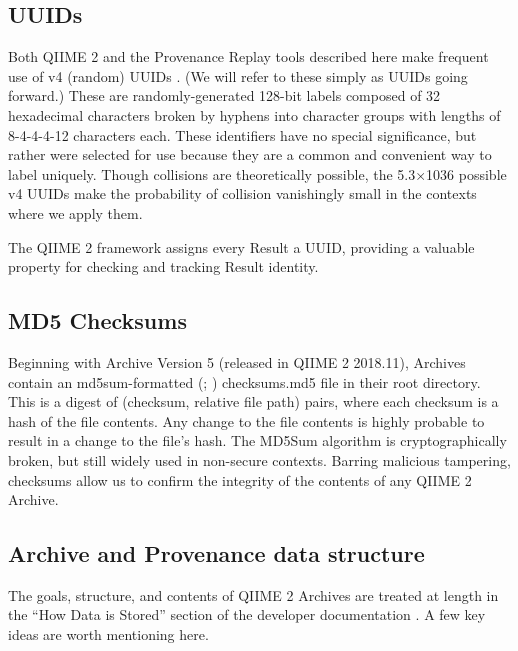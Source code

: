 \subsection{UUIDs}

Both QIIME 2 and the Provenance Replay tools described here make frequent use of
v4 (random) UUIDs \parencite{leach_universally_2005}.
(We will refer to these simply as UUIDs going forward.)
These are randomly-generated 128-bit labels composed of 32 hexadecimal
characters broken by hyphens into character groups with lengths of 8-4-4-4-12
characters each. These identifiers have no special significance, but rather were
selected for use because they are a common and convenient way to label uniquely.
Though collisions are theoretically possible, the 5.3×1036 possible v4 UUIDs
make the probability of collision vanishingly small in the contexts where we
apply them.

The QIIME 2 framework assigns every Result a UUID, providing a valuable property
for checking and tracking Result identity. 

\subsection{MD5 Checksums}

Beginning with Archive Version 5 (released in QIIME 2 2018.11), Archives contain
an md5sum-formatted (\cite{rivest_md5_1992}; \cite{ulrich_drepper_md5sum1_2010})
checksums.md5 file in their root directory. This is a digest of (checksum,
relative file path) pairs, where each checksum is a hash of the file contents.
Any change to the file contents is highly probable to result in a change to the
file’s hash. The MD5Sum algorithm is cryptographically broken, but still widely
used in non-secure contexts. Barring malicious tampering, checksums allow us to
confirm the integrity of the contents of any QIIME 2 Archive.

\subsection{Archive and Provenance data structure}
The goals, structure, and contents of QIIME 2 Archives are treated at length in
the “How Data is Stored” section of the developer documentation \parencite{qiime_2_development_team_how_2018}.
A few key ideas are worth mentioning here.

